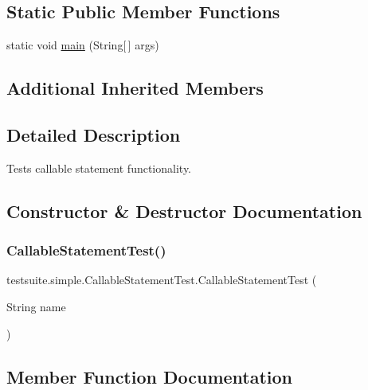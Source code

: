 \subsection*{Static Public Member Functions}
\begin{DoxyCompactItemize}
\item 
static void \mbox{\hyperlink{classtestsuite_1_1simple_1_1_callable_statement_test_a719a94d42424a377d55c18fd915bb356}{main}} (String\mbox{[}$\,$\mbox{]} args)
\end{DoxyCompactItemize}
\subsection*{Additional Inherited Members}


\subsection{Detailed Description}
Tests callable statement functionality. 

\subsection{Constructor \& Destructor Documentation}
\mbox{\label{classtestsuite_1_1simple_1_1_callable_statement_test_aea47c080476cb1ba38504913a365d668}} 
\subsubsection{\texorpdfstring{Callable\+Statement\+Test()}{CallableStatementTest()}}
{\footnotesize\ttfamily testsuite.\+simple.\+Callable\+Statement\+Test.\+Callable\+Statement\+Test (\begin{DoxyParamCaption}\item[{String}]{name }\end{DoxyParamCaption})}



\subsection{Member Function Documentation}
\mbox{\label{classtestsuite_1_1simple_1_1_callable_statement_test_a719a94d42424a377d55c18fd915bb356}} 
